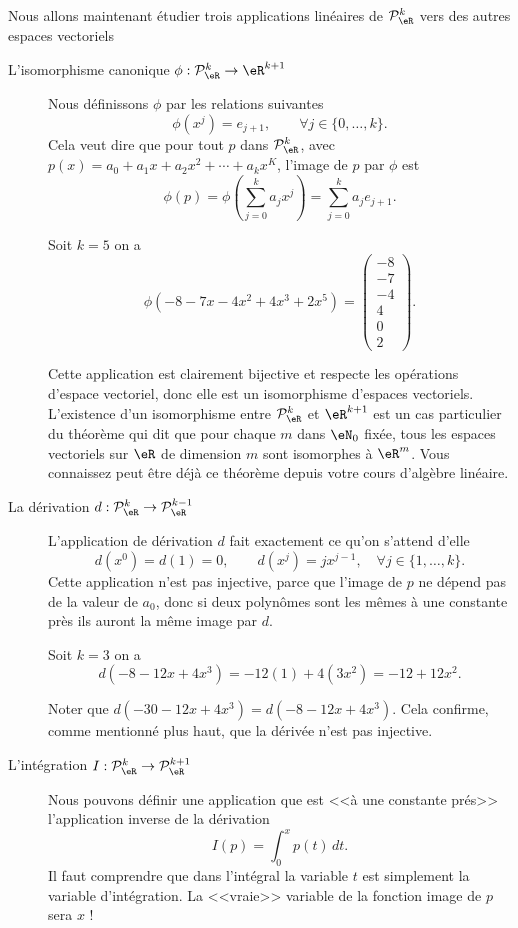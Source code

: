 Nous allons maintenant étudier trois applications linéaires de $\mathcal{P}_\eR^k$ vers des autres espaces vectoriels
\begin{description}
  \item[L'isomorphisme canonique  $\phi:\mathcal{P}_\eR^k \to\eR^{k+1}$] Nous définissons $\phi$ par les relations suivantes
\[
\phi(x^j)=e_{j+1}, \qquad \forall j\in\{0,\dots, k\}. 
\]
Cela veut dire que pour tout $p$ dans $\mathcal{P}_\eR^k$, avec $p(x)=a_0+a_1 x +a_2 x^2 + \cdots+a_k x^K$, l'image de $p$ par $\phi$ est 
\[
\phi(p)=\phi\left(\sum_{j=0}^k a_j x^j\right)=\sum_{j=0}^k a_j e_{j+1}.
\]
\begin{example} Soit $k=5$ on a 
  \begin{equation}
    \phi(-8-7x-4x^2+4x^3+2x^5)=
  \begin{pmatrix}
    -8\\
    -7\\
    -4\\
    4\\
    0\\
    2
  \end{pmatrix}.
  \end{equation}
\end{example}

Cette application est clairement bijective et respecte les opérations d'espace vectoriel, donc elle est un isomorphisme d'espaces vectoriels. L'existence d'un isomorphisme entre $\mathcal{P}_\eR^k$  et $\eR^{k+1}$ est un cas particulier du théorème qui dit que  pour chaque $m$ dans $\eN_0$ fixée, tous les espaces vectoriels sur $\eR$ de dimension $m$ sont isomorphes à $\eR^m$. Vous connaissez peut être déjà ce théorème depuis votre cours d'algèbre linéaire.  
    \item[La dérivation $d: \mathcal{P}_\eR^k \to \mathcal{P}_\eR^{k-1}$] L'application de dérivation $d$ fait exactement ce qu'on s'attend d'elle 
\[
d(x^0)=d(1)=0, \qquad d(x^j)=j x^{j-1}, \quad \forall j\in\{1,\dots, k\}. 
\]
Cette application n'est pas injective, parce que l'image de $p$ ne dépend pas de la valeur de $a_0$, donc si deux polynômes sont les mêmes à une constante près ils auront la même image par $d$.

\begin{example} Soit $k=3$ on a 
  \begin{equation}
    d(-8-12x+4x^3)= -12 (1) + 4 (3x^2) = -12+12 x^2.
    \end{equation}

    Noter que $d(-30-12x+4x^3)=d(-8-12x+4x^3)$. Cela confirme, comme mentionné plus haut, que la dérivée n'est pas injective.
\end{example}
      \item[L'intégration $I: \mathcal{P}_\eR^k \to \mathcal{P}_\eR^{k+1}$] Nous pouvons définir une application que est <<à une constante prés>> l'application inverse de la dérivation
        \begin{equation}
          I(p)= \int_0^x p(t) \,dt.
        \end{equation}
Il faut comprendre que dans l'intégral la variable $t$ est simplement la variable d'intégration. La <<vraie>> variable de la fonction image de $p$ sera $x$ !
 

\end{description}
